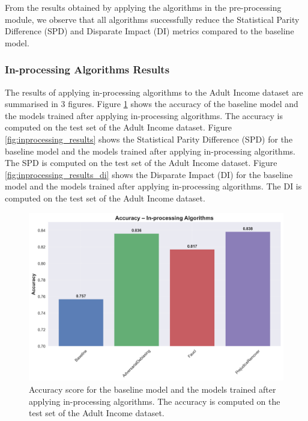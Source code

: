 \documentclass[12pt,a4paper,openright,twoside]{book}
\begin{document}
From the results obtained by applying the algorithms in the pre-processing module, we observe that all algorithms successfully reduce the Statistical Parity Difference (SPD) and Disparate Impact (DI) metrics compared to the baseline model.

\subsubsection{In-processing Algorithms Results}

The results of applying in-processing algorithms to the Adult Income dataset are summarised in 3 figures. Figure \ref{fig:baseline_results_inprocessing} shows the accuracy of the baseline model and the models trained after applying in-processing algorithms. The accuracy is computed on the test set of the Adult Income dataset.
Figure \ref{fig:inprocessing_results} shows the Statistical Parity Difference (SPD) for the baseline model and the models trained after applying in-processing algorithms. The SPD is computed on the test set of the Adult Income dataset. Figure \ref{fig:inprocessing_results_di} shows the Disparate Impact (DI) for the baseline model and the models trained after applying in-processing algorithms. The DI is computed on the test set of the Adult Income dataset.

\begin{figure}
    \centering
    \includegraphics[width=\textwidth]{figures/inprocessing_results/inprocessing_accuracy_comparison.png}
    \caption{Accuracy score for the baseline model and the models trained after applying in-processing algorithms. The accuracy is computed on the test set of the Adult Income dataset.}
    \label{fig:baseline_results_inprocessing}
\end{figure}
\end{document}
